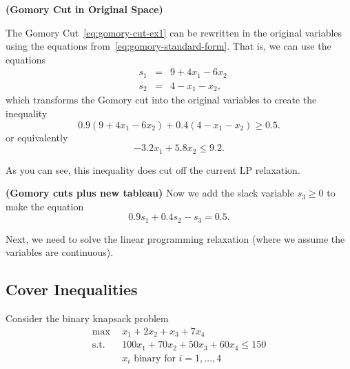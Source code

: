 \begin{example}{\textbf{(Gomory Cut in Original Space)}}{}

The Gomory Cut~\eqref{eq:gomory-cut-ex1} can be rewritten in the original variables using the equations from~\eqref{eq:gomory-standard-form}.  That is, we can use the equations
\begin{equation}
\label{eq:gomory-standard-form-equations}
\begin{array}{lrcl}
 & s_1 & = & 9 + 4x_1 - 6x_2\\
&s_2  & = & 4 - x_1 - x_2,
\end{array}
\end{equation}
which transforms the Gomory cut into the original variables to create the inequality
\begin{equation*}
\label{eq:gomory-cut-ex1-original}
0.9 (9 + 4x_1 - 6x_2) + 0.4(4 - x_1 - x_2) \geq 0.5.
\end{equation*}
or equivalently
\begin{equation}
\label{eq:gomory-cut-ex1-original}
- 3.2 x_1 + 5.8 x_2 \leq 9.2.
\end{equation}
%

As you can see, this inequality does cut off the current LP relaxation.

\end{example}


\begin{example}{\textbf{(Gomory  cuts plus new tableau)}}{}
Now we add the slack variable $s_3 \geq 0$ to make the equation
\begin{equation}
0.9 s_1 + 0.4 s_2 - s_3 = 0.5.
\end{equation}


\end{example}


Next, we need to solve the linear programming relaxation (where we assume the variables are continuous).

\subsection{Cover Inequalities}
Consider the binary knapsack problem
\begin{align*}
\max \ \ & x_1 + 2x_2 + x_3 + 7 x_4\\
\text{s.t.} \ \ & 100 x_1 + 70x_2 + 50 x_3 + 60 x_4 \leq 150\\
& x_i  \text{ binary  for } i =1, \dots, 4
\end{align*}

